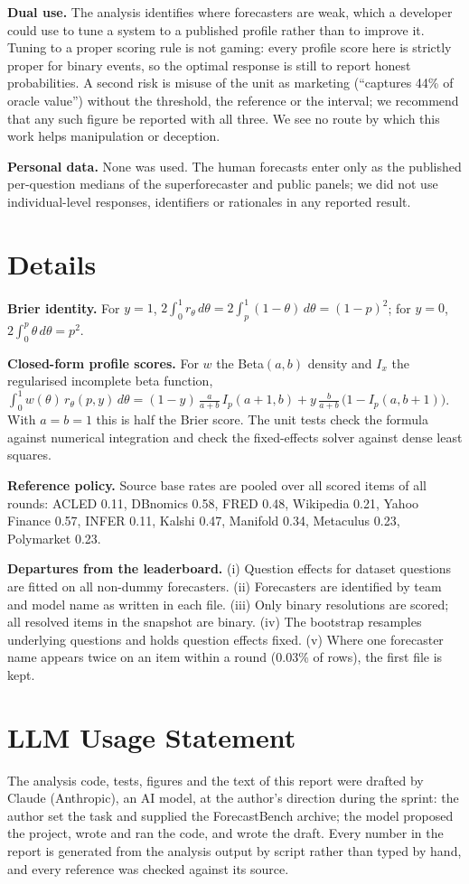 \documentclass[10pt]{article}
\begin{document}
\textbf{Dual use.} The analysis identifies where forecasters are weak, which a developer could use to tune a system to a published profile rather than to improve it. Tuning to a proper scoring rule is not gaming: every profile score here is strictly proper for binary events, so the optimal response is still to report honest probabilities. A second risk is misuse of the unit as marketing (``captures 44\% of oracle value'') without the threshold, the reference or the interval; we recommend that any such figure be reported with all three. We see no route by which this work helps manipulation or deception.

\textbf{Personal data.} None was used. The human forecasts enter only as the published per-question medians of the superforecaster and public panels; we did not use individual-level responses, identifiers or rationales in any reported result.

\section{Details}\label{app:details}
\textbf{Brier identity.} For $y=1$, $2\int_0^1 r_\theta\,d\theta=2\int_p^1(1-\theta)\,d\theta=(1-p)^2$; for $y=0$, $2\int_0^p\theta\,d\theta=p^2$.

\textbf{Closed-form profile scores.} For $w$ the Beta$(a,b)$ density and $I_x$ the regularised incomplete beta function,
$\int_0^1 w(\theta)\,r_\theta(p,y)\,d\theta=(1-y)\,\tfrac{a}{a+b}\,I_p(a+1,b)+y\,\tfrac{b}{a+b}\,\bigl(1-I_p(a,b+1)\bigr)$. With $a=b=1$ this is half the Brier score. The unit tests check the formula against numerical integration and check the fixed-effects solver against dense least squares.

\textbf{Reference policy.} Source base rates are pooled over all scored items of all rounds: ACLED 0.11, DBnomics 0.58, FRED 0.48, Wikipedia 0.21, Yahoo Finance 0.57, INFER 0.11, Kalshi 0.47, Manifold 0.34, Metaculus 0.23, Polymarket 0.23.

\textbf{Departures from the leaderboard.} (i) Question effects for dataset questions are fitted on all non-dummy forecasters. (ii) Forecasters are identified by team and model name as written in each file. (iii) Only binary resolutions are scored; all resolved items in the snapshot are binary. (iv) The bootstrap resamples underlying questions and holds question effects fixed. (v) Where one forecaster name appears twice on an item within a round (0.03\% of rows), the first file is kept.

\section*{LLM Usage Statement}
The analysis code, tests, figures and the text of this report were drafted by Claude (Anthropic), an AI model, at the author's direction during the sprint: the author set the task and supplied the ForecastBench archive; the model proposed the project, wrote and ran the code, and wrote the draft. Every number in the report is generated from the analysis output by script rather than typed by hand, and every reference was checked against its source.
\end{document}
